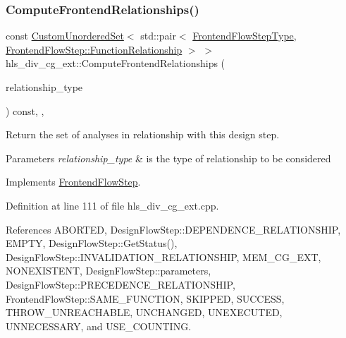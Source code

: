 \subsubsection{\texorpdfstring{Compute\+Frontend\+Relationships()}{ComputeFrontendRelationships()}}
{\footnotesize\ttfamily const \hyperlink{classCustomUnorderedSet}{Custom\+Unordered\+Set}$<$ std\+::pair$<$ \hyperlink{frontend__flow__step_8hpp_afeb3716c693d2b2e4ed3e6d04c3b63bb}{Frontend\+Flow\+Step\+Type}, \hyperlink{classFrontendFlowStep_af7cf30f2023e5b99e637dc2058289ab0}{Frontend\+Flow\+Step\+::\+Function\+Relationship} $>$ $>$ hls\+\_\+div\+\_\+cg\+\_\+ext\+::\+Compute\+Frontend\+Relationships (\begin{DoxyParamCaption}\item[{const \hyperlink{classDesignFlowStep_a723a3baf19ff2ceb77bc13e099d0b1b7}{Design\+Flow\+Step\+::\+Relationship\+Type}}]{relationship\+\_\+type }\end{DoxyParamCaption}) const\hspace{0.3cm}{\ttfamily [override]}, {\ttfamily [protected]}, {\ttfamily [virtual]}}



Return the set of analyses in relationship with this design step. 


\begin{DoxyParams}{Parameters}
{\em relationship\+\_\+type} & is the type of relationship to be considered \\
\hline
\end{DoxyParams}


Implements \hyperlink{classFrontendFlowStep_abeaff70b59734e462d347ed343dd700d}{Frontend\+Flow\+Step}.



Definition at line 111 of file hls\+\_\+div\+\_\+cg\+\_\+ext.\+cpp.



References A\+B\+O\+R\+T\+ED, Design\+Flow\+Step\+::\+D\+E\+P\+E\+N\+D\+E\+N\+C\+E\+\_\+\+R\+E\+L\+A\+T\+I\+O\+N\+S\+H\+IP, E\+M\+P\+TY, Design\+Flow\+Step\+::\+Get\+Status(), Design\+Flow\+Step\+::\+I\+N\+V\+A\+L\+I\+D\+A\+T\+I\+O\+N\+\_\+\+R\+E\+L\+A\+T\+I\+O\+N\+S\+H\+IP, M\+E\+M\+\_\+\+C\+G\+\_\+\+E\+XT, N\+O\+N\+E\+X\+I\+S\+T\+E\+NT, Design\+Flow\+Step\+::parameters, Design\+Flow\+Step\+::\+P\+R\+E\+C\+E\+D\+E\+N\+C\+E\+\_\+\+R\+E\+L\+A\+T\+I\+O\+N\+S\+H\+IP, Frontend\+Flow\+Step\+::\+S\+A\+M\+E\+\_\+\+F\+U\+N\+C\+T\+I\+ON, S\+K\+I\+P\+P\+ED, S\+U\+C\+C\+E\+SS, T\+H\+R\+O\+W\+\_\+\+U\+N\+R\+E\+A\+C\+H\+A\+B\+LE, U\+N\+C\+H\+A\+N\+G\+ED, U\+N\+E\+X\+E\+C\+U\+T\+ED, U\+N\+N\+E\+C\+E\+S\+S\+A\+RY, and U\+S\+E\+\_\+\+C\+O\+U\+N\+T\+I\+NG.

